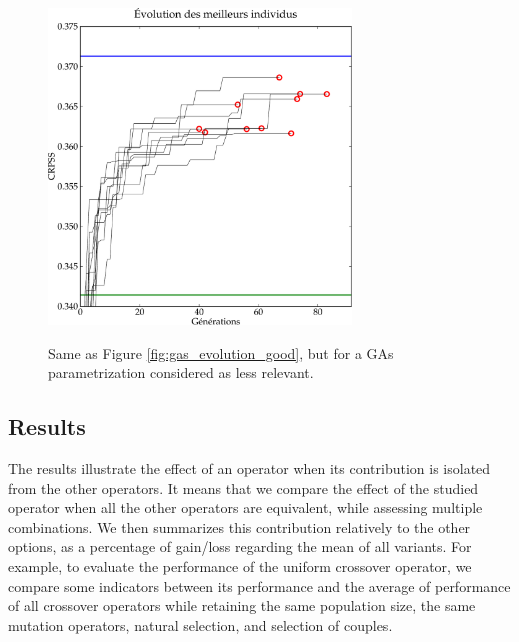 \documentclass[twocol]{ametsoc}
\begin{document}
\begin{figure}[htb]
	\begin{center}
		\noindent\includegraphics[width=19pc,angle=0]{figures/gas_evolution_bad.pdf}\\
	\end{center}
	\caption{Same as Figure \ref{fig:gas_evolution_good}, but for a GAs parametrization considered as less relevant.}
	\label{fig:gas_evolution_bad}
\end{figure}



\subsection{Results}

The results illustrate the effect of an operator when its contribution is isolated from the other operators. It means that we compare the effect of the studied operator when all the other operators are equivalent, while assessing multiple combinations. We then summarizes this contribution relatively to the other options, as a percentage of gain/loss regarding the mean of all variants. For example, to evaluate the performance of the uniform crossover operator, we compare some indicators between its performance and the average of performance of all crossover operators while retaining the same population size, the same mutation operators, natural selection, and selection of couples.
\end{document}
